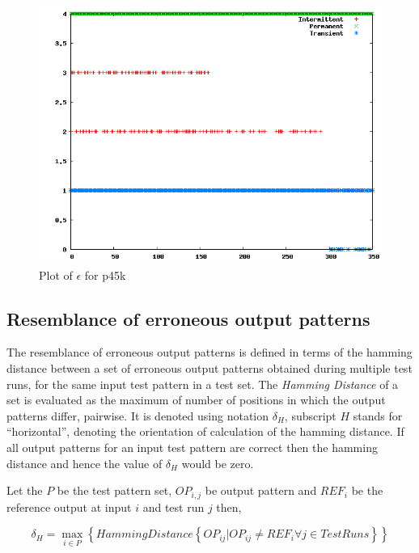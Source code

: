 \begin{figure}[h]
  \begin{center}
    \captionsetup{justification=centering}
    \includegraphics[scale=0.35]{figures/epsilonp45k.png}
    \caption{Plot of $\epsilon$ for p45k}
    \label{fig:epsilonp45k}
  \end{center}
\end{figure}

\subsection{Resemblance of erroneous output patterns}
The resemblance of erroneous output patterns is defined in terms of the hamming distance between a set of erroneous output patterns obtained during multiple test runs, for the same input test pattern in a test set. The \emph{Hamming Distance} of a set is evaluated as the maximum of number of positions in which the output patterns differ, pairwise. It is denoted using notation $\delta_H$, subscript $H$ stands for \enquote{horizontal}, denoting the orientation of calculation of the hamming distance. If all output patterns for an input test pattern are correct then the hamming distance and hence the value of $\delta_H$ would be zero.

Let the $P$ be the test pattern set, $OP_{i,j}$ be output pattern and $REF_i$ be the reference output at input $i$ and test run $j$ then,

\[
\delta_H = \max\limits_{i\in P} \left\{HammingDistance 
\left\{OP_{ij} | OP_{ij} \neq REF_i \forall j \in TestRuns\right\} 
\right\} 
\]

